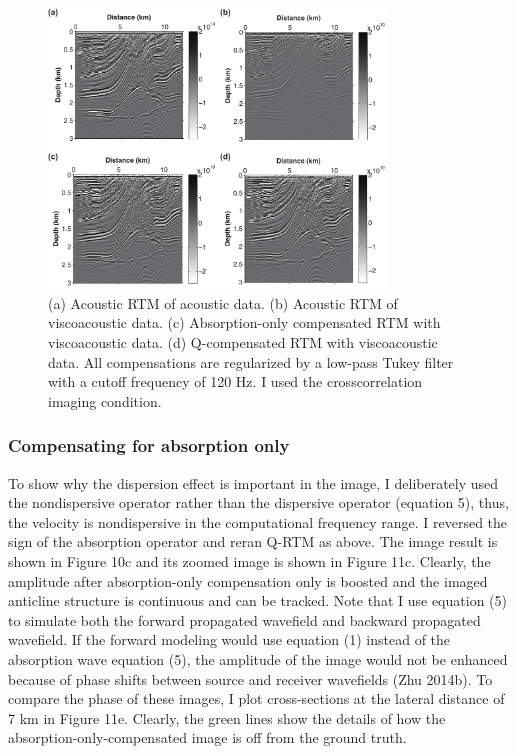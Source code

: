  \begin{figure}[!htb]
   \centering
   \includegraphics[width=0.8\textwidth]{Fig/fig10-eps-converted-to}
   \caption{(a) Acoustic RTM of acoustic data. (b) Acoustic RTM of viscoacoustic data. (c) Absorption-only compensated RTM with viscoacoustic data. (d) Q-compensated RTM with viscoacoustic data. All compensations are regularized by a low-pass Tukey filter with a cutoff frequency of 120 Hz. I used the crosscorrelation imaging condition.}
 \end{figure}

\subsubsection{Compensating for absorption only}
To show why the dispersion effect is important in the image, I deliberately used the nondispersive operator   rather than the dispersive operator (equation 5), thus, the velocity is nondispersive in the computational frequency range. I reversed the sign of the absorption operator and reran Q-RTM as above. The image result is shown in Figure 10c and its zoomed image is shown in Figure 11c. Clearly, the amplitude after absorption-only compensation only is boosted and the imaged anticline structure is continuous and can be tracked. Note that I use equation (5) to simulate both the forward propagated wavefield and backward propagated wavefield. If the forward modeling would use equation (1) instead of the absorption wave equation (5), the amplitude of the image would not be enhanced because of phase shifts between source and receiver wavefields (Zhu 2014b). To compare the phase of these images, I plot cross-sections at the lateral distance of 7 km in Figure 11e. Clearly, the green lines show the details of how the absorption-only-compensated image is off from the ground truth. 

